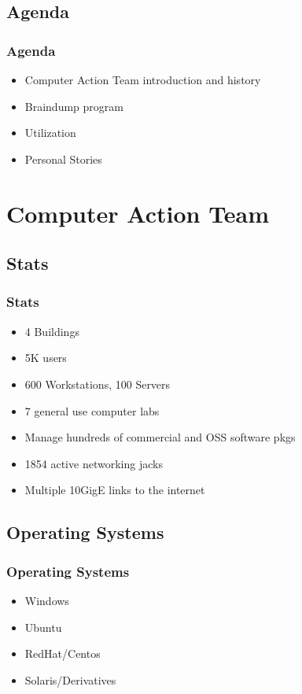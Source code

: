 \documentclass{beamer}
\begin{document}
\subsection{Agenda}
\frame
{
    \frametitle{Agenda}
    \begin{itemize}
        \item Computer Action Team introduction and history
        \item Braindump program
        \item Utilization
        \item Personal Stories
    \end{itemize}
}

\section{Computer Action Team}
\subsection{Stats}
\frame
{
    \frametitle{Stats}
    \begin{itemize}
        \item 4 Buildings
        \item 5K users
        \item 600 Workstations, 100 Servers
        \item 7 general use computer labs
        \item Manage hundreds of commercial and OSS software pkgs
        \item 1854 active networking jacks
        \item Multiple 10GigE links to the internet
    \end{itemize}

}

\subsection{Operating Systems}
\frame
{
    \frametitle{Operating Systems}
    \begin{itemize}
        \item Windows
        \item Ubuntu
        \item RedHat/Centos
        \item Solaris/Derivatives
    \end{itemize}
}

\end{document}
